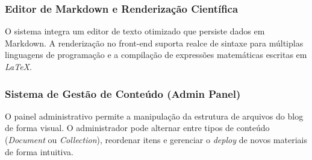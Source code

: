 \subsubsection{Editor de Markdown e Renderização Científica}
O sistema integra um editor de texto otimizado que persiste dados em Markdown. A renderização no front-end suporta realce de sintaxe para múltiplas linguagens de programação e a compilação de expressões matemáticas escritas em \textit{LaTeX}.

\subsubsection{Sistema de Gestão de Conteúdo (Admin Panel)}
O painel administrativo permite a manipulação da estrutura de arquivos do blog de forma visual. O administrador pode alternar entre tipos de conteúdo (\textit{Document} ou \textit{Collection}), reordenar itens e gerenciar o \textit{deploy} de novos materiais de forma intuitiva.